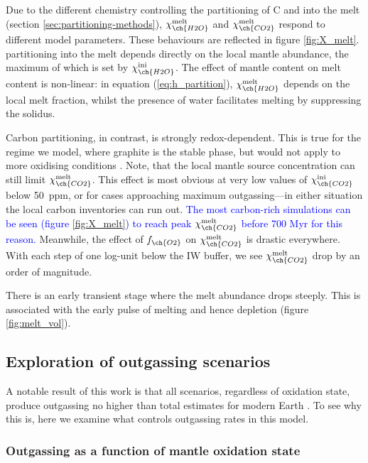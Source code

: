 \documentclass[3p,authoryear]{elsarticle}
\newcommand{\editthree}[2]{\textcolor{blue}{\sout{#1}#2}}
\begin{document}
Due to the different chemistry controlling the partitioning of C and  into the melt (section \ref{sec:partitioning-methods}), $\chi_{\ch{H2O}}^{\rm melt}$ and $\chi_{\ch{CO2}}^{\rm melt}$ respond to different model parameters. These behaviours are reflected in figure \ref{fig:X_melt}.  partitioning into the melt depends directly on the local mantle  abundance, the maximum of which is set by $\chi_{\ch{H2O}}^{\rm ini}$. The effect of mantle content on melt content is non-linear: in equation (\ref{eq:h_partition}), $\chi_{\ch{H2O}}^{\rm melt}$ depends on the local melt fraction, whilst the presence of water facilitates melting by suppressing the solidus.

Carbon partitioning, in contrast, is strongly redox-dependent. This is true for the regime we model, where graphite is the stable phase, but would not apply to more oxidising conditions \citep{Stagno2019}. Note, that the local mantle source  concentration can still limit $\chi_{\ch{CO2}}^{\rm melt}$. This effect is most obvious at very low values of $\chi_{\ch{CO2}}^{\rm ini}$ below 50~ppm, or for cases approaching maximum outgassing---in either situation the local carbon inventories can run out. \editthree{}{The most carbon-rich simulations can be seen (figure \ref{fig:X_melt}) to reach peak $\chi_{\ch{CO2}}^{\rm melt}$ before 700 Myr for this reason.} Meanwhile, the effect of $f_{\ch{O2}}$ on $\chi_{\ch{CO2}}^{\rm melt}$ is drastic everywhere. With each step of one log-unit below the IW buffer, we see $\chi_{\ch{CO2}}^{\rm melt}$ drop by an order of magnitude.

There is an early transient stage where the melt abundance drops steeply. This is associated with the early pulse of melting and hence depletion (figure \ref{fig:melt_vol}). 

\subsection{Exploration of outgassing scenarios}



A notable result of this work is that all scenarios, regardless of oxidation state, produce outgassing no higher than total estimates for modern Earth \citep[e.g.,][]{Catling2017}. To see why this is, here we examine what controls outgassing rates in this model.

\subsubsection{Outgassing as a function of mantle oxidation state}
\end{document}
